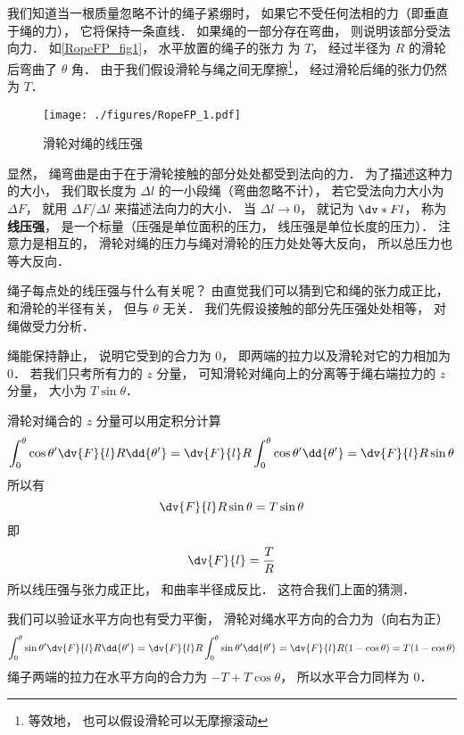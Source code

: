 

我们知道当一根质量忽略不计的绳子紧绷时， 如果它不受任何法相的力（即垂直于绳的力）， 它将保持一条直线． 如果绳的一部分存在弯曲， 则说明该部分受法向力． 如\autoref{RopeFP_fig1}， 水平放置的绳子的张力%
为 $T$， 经过半径为 $R$ 的滑轮后弯曲了 $\theta$ 角． 由于我们假设滑轮与绳之间无摩擦\footnote{等效地， 也可以假设滑轮可以无摩擦滚动}， 经过滑轮后绳的张力仍然为 $T$．
\begin{figure}[ht]
\centering
\texttt{[image: ./figures/RopeFP\_1.pdf]}
\caption{滑轮对绳的线压强} \label{RopeFP_fig1}
\end{figure}

显然， 绳弯曲是由于在于滑轮接触的部分处处都受到法向的力． 为了描述这种力的大小， 我们取长度为 $\Delta l$ 的一小段绳（弯曲忽略不计）， 若它受法向力大小为 $\Delta F$， 就用 $\Delta F/\Delta l$ 来描述法向力的大小． 当 $\Delta l \to 0$， 就记为 $\dv*{F}{l}$， 称为\textbf{线压强}， 是一个标量（压强是单位面积的压力， 线压强是单位长度的压力）． 注意力是相互的， 滑轮对绳的压力与绳对滑轮的压力处处等大反向， 所以总压力也等大反向．

绳子每点处的线压强与什么有关呢？ 由直觉我们可以猜到它和绳的张力成正比， 和滑轮的半径有关， 但与 $\theta$ 无关． 我们先假设接触的部分先压强处处相等， 对绳做受力分析．

绳能保持静止， 说明它受到的合力为 0， 即两端的拉力以及滑轮对它的力相加为 0． 若我们只考所有力的 $z$ 分量， 可知滑轮对绳向上的分离等于绳右端拉力的 $z$ 分量， 大小为 $T \sin\theta$．

滑轮对绳合的 $z$ 分量可以用定积分计算
\begin{equation}
\int_0^\theta \cos\theta' \dv{F}{l} R\dd{\theta'}
= \dv{F}{l} R \int_0^\theta \cos\theta' \dd{\theta'}
= \dv{F}{l} R \sin\theta
\end{equation}
所以有
\begin{equation}
\dv{F}{l} R \sin\theta = T \sin\theta
\end{equation}
即
\begin{equation}\label{RopeFP_eq1}
\dv{F}{l} = \frac{T}{R}
\end{equation}
所以线压强与张力成正比， 和曲率半径成反比． 这符合我们上面的猜测．

我们可以验证水平方向也有受力平衡， 滑轮对绳水平方向的合力为（向右为正）
\begin{equation}
\int_0^\theta \sin\theta' \dv{F}{l} R\dd{\theta'}
= \dv{F}{l} R \int_0^\theta \sin\theta' \dd{\theta'}
= \dv{F}{l} R (1 - \cos\theta)
= T(1 - \cos\theta)
\end{equation}
绳子两端的拉力在水平方向的合力为 $-T + T\cos\theta$， 所以水平合力同样为 0．

